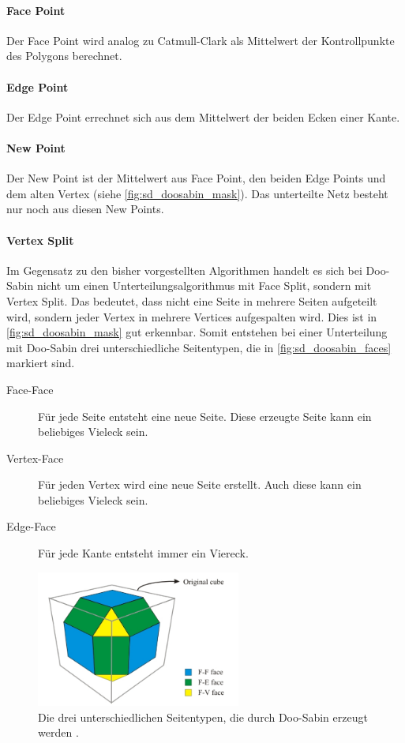 \paragraph*{Face Point}
Der Face Point wird analog zu Catmull-Clark als Mittelwert der Kontrollpunkte des Polygons
berechnet.

\paragraph*{Edge Point}
Der Edge Point errechnet sich aus dem Mittelwert der beiden Ecken einer Kante.

\paragraph*{New Point}
Der New Point ist der Mittelwert aus Face Point, den beiden Edge Points und dem alten Vertex
(siehe \autoref{fig:sd_doosabin_mask}). Das unterteilte Netz besteht nur noch aus diesen New Points.

\paragraph*{Vertex Split}
Im Gegensatz zu den bisher vorgestellten Algorithmen handelt es sich bei Doo-Sabin nicht um einen
Unterteilungsalgorithmus mit Face Split, sondern mit Vertex Split.
Das bedeutet, dass nicht eine Seite in mehrere Seiten aufgeteilt wird, sondern
jeder Vertex in mehrere Vertices aufgespalten wird.
Dies ist in \autoref{fig:sd_doosabin_mask} gut erkennbar.
Somit entstehen bei einer Unterteilung mit Doo-Sabin drei unterschiedliche Seitentypen,
die in \autoref{fig:sd_doosabin_faces} markiert sind.
\begin{description}
 \item[Face-Face] Für jede Seite entsteht eine neue Seite.
 Diese erzeugte Seite kann ein beliebiges Vieleck sein.
 \item[Vertex-Face] Für jeden Vertex wird eine neue Seite erstellt.
 Auch diese kann ein beliebiges Vieleck sein.
 \item[Edge-Face] Für jede Kante entsteht immer ein Viereck.
\end{description}
\cite{Yoshihitoyagi.doosabin} \cite{UniCalifornia} \cite{Olsen}

\begin{figure}
\centering
\includegraphics[width=0.6\textwidth]{content/media/sd_doosabin_face_types.jpg}
\caption{Die drei unterschiedlichen Seitentypen, die durch Doo-Sabin erzeugt werden \cite{Olsen}.}
\label{fig:sd_doosabin_faces}
\end{figure}



